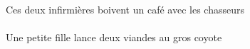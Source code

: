\begin{exe}
\ex\gll
\DEFPlObl{}   \chasseurCPlObl{}   \AVEC{}   \DEMDuErg{}   \infirmiereADuErg{}   \INDSgAbs{}   \cafeCSgAbs{}  \boireVtPrsCSg{}\\
\DEFPlOblP{}   \chasseurCPlOblP{}   \AVECP{}   \DEMDuErgP{}   \infirmiereADuErgP{}   \INDSgAbsP{}   \cafeCSgAbsP{}  \boireVtPrsCSgP{}\\
Ces deux infirmières boivent un café avec les chasseurs
\ex\gll
\INDSgErg{}   \petitCSg{}   \filleCSgErg{}    \DEFSgDat{}   \grosCSg{}   \coyoteCSgDat{}   \INDDuAbs{}   \viandeADuAbs{}  \lancerVdPrsADu{}\\
\INDSgErgP{}   \petitCSgP{}   \filleCSgErgP{}    \DEFSgDatP{}   \grosCSgP{}   \coyoteCSgDatP{}   \INDDuAbsP{}   \viandeADuAbsP{}  \lancerVdPrsADuP{}\\
Une petite fille lance deux viandes au gros coyote
\end{exe}
